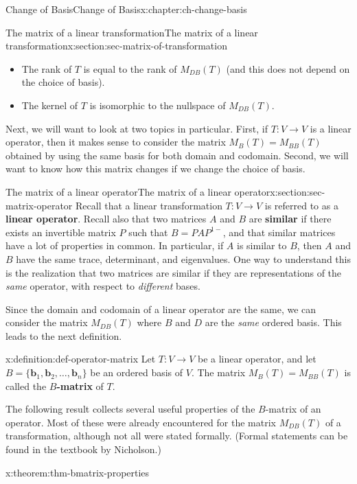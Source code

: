 \documentclass[oneside,10pt,]{book}
\newcommand{\terminology}[1]{\textbf{#1}}
\numberwithin{equation}{section}
\newcommand{\basis}[2]{\{\mathbf{#1}_1,\mathbf{#1}_2,\ldots,\mathbf{#1}_{#2}\}}
\begin{document}
\begin{chapterptx}{Change of Basis}{}{Change of Basis}{}{}{x:chapter:ch-change-basis}
\begin{sectionptx}{The matrix of a linear transformation}{}{The matrix of a linear transformation}{}{}{x:section:sec-matrix-of-transformation}
\begin{itemize}[label=\textbullet]
\item{}The rank of \(T\)  is equal to the rank of \(M_{DB}(T)\) (and this does not depend on the choice of basis).%
\item{}The kernel of \(T\) is isomorphic to the nullspace of \(M_{DB}(T)\).%
\end{itemize}
%
\par
Next, we will want to look at two topics in particular. First, if \(T:V\to V\) is a linear operator, then it makes sense to consider the matrix \(M_B(T)=M_{BB}(T)\) obtained by using the same basis for both domain and codomain. Second, we will want to know how this matrix changes if we change the choice of basis.%
\end{sectionptx}
%
%
\typeout{************************************************}
\typeout{************************************************}
%
\begin{sectionptx}{The matrix of a linear operator}{}{The matrix of a linear operator}{}{}{x:section:sec-matrix-operator}
Recall that a linear transformation \(T:V\to V\) is referred to as a \terminology{linear operator}. Recall also that two matrices \(A\) and \(B\) are \terminology{similar} if there exists an invertible matrix \(P\) such that \(B = PAP^{1-}\), and that similar matrices have a lot of properties in common. In particular, if \(A\) is similar to \(B\), then \(A\) and \(B\) have the same trace, determinant, and eigenvalues. One way to understand this is the realization that two matrices are similar if they are representations of the \emph{same} operator, with respect to \emph{different} bases.%
\par
Since the domain and codomain of a linear operator are the same, we can consider the matrix \(M_{DB}(T)\) where \(B\) and \(D\) are the \emph{same} ordered basis. This leads to the next definition.%
\begin{definition}{}{x:definition:def-operator-matrix}%
Let \(T:V\to V\) be a linear operator, and let \(B=\basis{b}{n}\) be an ordered basis of \(V\). The matrix \(M_B(T)=M_{BB}(T)\) is called the \terminology{\(B\)-matrix} of \(T\).%
\end{definition}
The following result collects several useful properties of the \(B\)-matrix of an operator. Most of these were already encountered for the matrix \(M_{DB}(T)\) of a transformation, although not all were stated formally. (Formal statements can be found in the textbook by Nicholson.)%
\begin{theorem}{}{}{x:theorem:thm-bmatrix-properties}%

\end{theorem}
\end{sectionptx}
\end{chapterptx}
\end{document}
